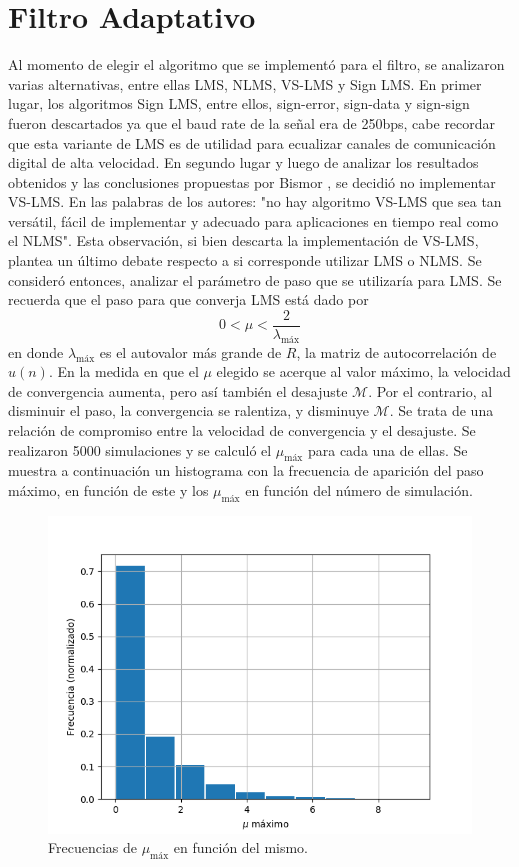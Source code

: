 \documentclass[main.tex]{subfiles}
\begin{document}
\section{Filtro Adaptativo}
Al momento de elegir el algoritmo que se implementó para el filtro, 
se analizaron varias alternativas, entre ellas LMS, NLMS, VS-LMS y Sign LMS.
En primer lugar, los algoritmos Sign LMS, entre ellos, sign-error, sign-data
y sign-sign fueron descartados ya que el baud rate de la señal era de 250bps,
cabe recordar que esta variante de LMS es de utilidad para ecualizar canales de
comunicación digital de alta velocidad. En segundo lugar y  luego de analizar 
los resultados obtenidos y las conclusiones propuestas por Bismor \cite{bismor},
se decidió no implementar VS-LMS. En las palabras de los autores: 
"no hay algoritmo VS-LMS que sea tan versátil, fácil de implementar y adecuado 
para aplicaciones en tiempo real como el NLMS".\newline
Esta observación, si bien descarta la implementación de VS-LMS, 
plantea un último debate respecto a si corresponde utilizar LMS o NLMS. 
Se consideró entonces, analizar el parámetro de paso que se utilizaría para LMS. 
Se recuerda que el paso para que converja LMS está dado por
\begin{equation}
    0<\mu<\frac{2}{\lambda_\text{máx}}
\end{equation}
en donde $\lambda_\text{máx}$ es el autovalor más grande de $R$, la matriz de 
autocorrelación de $u(n)$. En la medida en que el  $\mu$ elegido se acerque 
al valor máximo, la velocidad de convergencia aumenta, pero así también el desajuste $\mathscr{M}$.
Por el contrario, al disminuir el paso, la convergencia se ralentiza, y disminuye $\mathscr{M}$. 
Se trata de una relación de compromiso entre la velocidad de convergencia y el desajuste.
Se realizaron 5000 simulaciones y se calculó el $\mu_\text{máx}$ para cada una de ellas.
Se muestra a continuación un histograma con la frecuencia de aparición del paso máximo, 
en función de este y los $\mu_\text{máx}$ en función del número de simulación.
\begin{figure}[H]
    \centering
    \includegraphics[scale=0.5]{imagenes/lms_mus_hist.png}
    \caption{Frecuencias de $\mu_\text{máx}$ en función del mismo.}
\end{figure}
\end{document}
